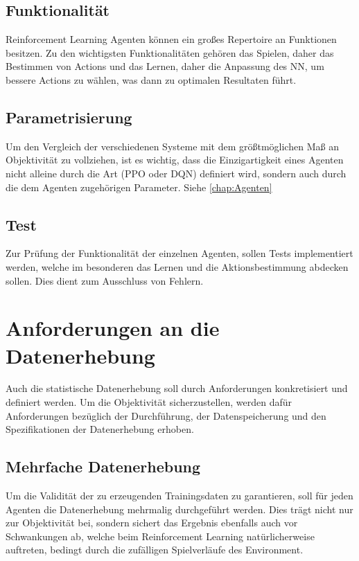 \subsection{Funktionalität}
Reinforcement Learning Agenten können ein großes Repertoire an Funktionen besitzen. Zu den wichtigsten Funktionalitäten gehören das Spielen, daher das Bestimmen von Actions und das Lernen, daher die Anpassung des NN, um bessere Actions zu wählen, was dann zu optimalen Resultaten führt.

\subsection{Parametrisierung}
Um den Vergleich der verschiedenen Systeme mit dem größtmöglichen Maß an Objektivität zu vollziehen, ist es wichtig, dass die Einzigartigkeit eines Agenten nicht alleine durch die Art (PPO oder DQN) definiert wird, sondern auch durch die dem Agenten zugehörigen Parameter. Siehe \ref{chap:Agenten}

\subsection{Test}
Zur Prüfung der Funktionalität der einzelnen Agenten, sollen Tests implementiert werden, welche im besonderen das Lernen und die Aktionsbestimmung abdecken sollen. Dies dient zum Ausschluss von Fehlern.

\section{Anforderungen an die Datenerhebung} \label{sec:Anforderungen_an_die Datenerhebung}
Auch die statistische Datenerhebung soll durch Anforderungen konkretisiert und definiert werden. Um die Objektivität sicherzustellen, werden dafür Anforderungen bezüglich der Durchführung, der Datenspeicherung und den Spezifikationen der Datenerhebung erhoben.

\subsection{Mehrfache Datenerhebung}
Um die Validität der zu erzeugenden Trainingsdaten zu garantieren, soll für jeden Agenten die Datenerhebung mehrmalig durchgeführt werden. Dies trägt nicht nur zur Objektivität bei, sondern sichert das Ergebnis ebenfalls auch vor Schwankungen ab, welche beim Reinforcement Learning natürlicherweise auftreten, bedingt durch die zufälligen Spielverläufe des Environment.

